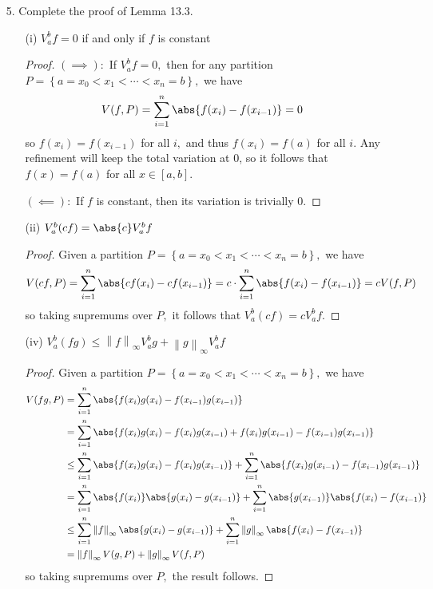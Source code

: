 \documentclass{article}
\begin{document}
\begin{itemize}
	\item[5.] Complete the proof of Lemma 13.3.
		\begin{itemize}
			\item[(i)] $V_a^bf=0$ if and only if $f$ is constant
				\begin{proof}
					$(\implies):$ If $V_a^b f = 0,$ then for any partition $P=\left\{ a=x_0<x_1<\cdots<x_n=b \right\},$ we have
					\begin{align*}
						V(f, P) &= \sum_{i=1}^{n} \abs{f(x_i)-f(x_{i-1})} = 0
					\end{align*}
					so $f(x_i)=f(x_{i-1})$ for all $i,$ and thus $f(x_i)=f(a)$ for all $i.$ Any refinement will keep the total variation at 0, so it follows that $f(x)=f(a)$ for all $x\in [a, b].$

					$(\impliedby):$ If $f$ is constant, then its variation is trivially 0.
				\end{proof}

			\item[(ii)] $V_a^b (cf) = \abs{c}V_a^b f$
				\begin{proof}
					Given a partition $P=\left\{ a=x_0<x_1<\cdots<x_n=b \right\},$ we have
					\begin{align*}
						V(cf, P) &= \sum_{i=1}^{n} \abs{cf(x_i)-cf(x_{i-1})} = c\cdot \sum_{i=1}^{n}\abs{f(x_i)-f(x_{i-1})} = cV(f, P)
					\end{align*}
					so taking supremums over $P,$ it follows that $V_a^b (cf)=cV_a^b f.$
				\end{proof}

			\item[(iv)] $V_a^b(fg)\le \left\lVert f \right\rVert_\infty V_a^b g + \left\lVert g \right\rVert_\infty V_a^b f$
				\begin{proof}
					Given a partition $P=\left\{ a=x_0<x_1<\cdots<x_n=b \right\},$ we have
					\begin{align*}
						V(fg, P) &= \sum_{i=1}^{n} \abs{f(x_i)g(x_i)-f(x_{i-1})g(x_{i-1})} \\
						&= \sum_{i=1}^{n} \abs{f(x_i)g(x_i) - f(x_i)g(x_{i-1}) + f(x_i)g(x_{i-1}) - f(x_{i-1})g(x_{i-1})} \\
						&\le \sum_{i=1}^{n} \abs{f(x_i)g(x_i)-f(x_i)g(x_{i-1})} + \sum_{i=1}^{n} \abs{f(x_i)g(x_{i-1}) - f(x_{i-1})g(x_{i-1})} \\
						&= \sum_{i=1}^{n} \abs{f(x_i)}\abs{g(x_i)-g(x_{i-1})} + \sum_{i=1}^{n} \abs{g(x_{i-1})}\abs{f(x_i)-f(x_{i-1})} \\
						&\le \sum_{i=1}^{n} \left\lVert f \right\rVert_\infty\abs{g(x_i)-g(x_{i-1})} + \sum_{i=1}^{n}\left\lVert g \right\rVert_\infty\abs{f(x_i)-f(x_{i-1})} \\
						&= \left\lVert f \right\rVert_\infty V(g, P) + \left\lVert g \right\rVert_\infty V(f, P)
					\end{align*}
					so taking supremums over $P,$ the result follows.
				\end{proof}


\end{itemize}
\end{itemize}
\end{document}
